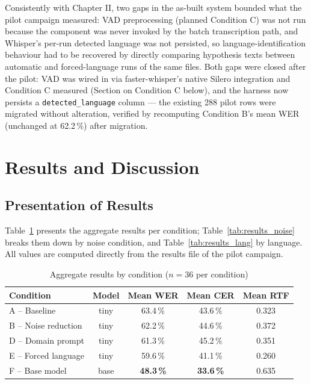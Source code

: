 \documentclass[12pt]{report}
\begin{document}
Consistently with Chapter II, two gaps in the as-built system bounded what the pilot campaign measured: VAD preprocessing (planned Condition C) was not run because the component was never invoked by the batch transcription path, and Whisper's per-run detected language was not persisted, so language-identification behaviour had to be recovered by directly comparing hypothesis texts between automatic and forced-language runs of the same files. Both gaps were closed after the pilot: VAD was wired in via faster-whisper's native Silero integration and Condition C measured (Section on Condition C below), and the harness now persists a \texttt{detected\_language} column --- the existing 288 pilot rows were migrated without alteration, verified by recomputing Condition B's mean WER (unchanged at 62.2\,\%) after migration.

\section{Results and Discussion}

\subsection{Presentation of Results}

Table~\ref{tab:results_agg} presents the aggregate results per condition; Table~\ref{tab:results_noise} breaks them down by noise condition, and Table~\ref{tab:results_lang} by language. All values are computed directly from the results file of the pilot campaign.

\begin{table}[H]
\centering
\begin{tabular}{|l|c|c|c|c|}
\hline
\textbf{Condition} & \textbf{Model} & \textbf{Mean WER} & \textbf{Mean CER} & \textbf{Mean RTF} \\ \hline
A -- Baseline & tiny & 63.4\,\% & 43.6\,\% & 0.323 \\ \hline
B -- Noise reduction & tiny & 62.2\,\% & 44.6\,\% & 0.372 \\ \hline
D -- Domain prompt & tiny & 61.3\,\% & 45.2\,\% & 0.351 \\ \hline
E -- Forced language & tiny & 59.6\,\% & 41.1\,\% & 0.260 \\ \hline
F -- Base model & base & \textbf{48.3\,\%} & \textbf{33.6\,\%} & 0.635 \\ \hline
\end{tabular}
\caption{Aggregate results by condition ($n=36$ per condition)}
\label{tab:results_agg}
\end{table}
\end{document}
